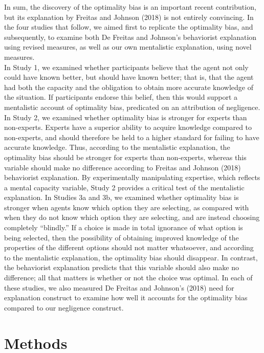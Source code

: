 \documentclass[
  man,floatsintext]{apa6}
\begin{document}
In sum, the discovery of the optimality bias is an important recent contribution, but its explanation by Freitas and Johnson (2018) is not entirely convincing. In the four studies that follow, we aimed first to replicate the optimality bias, and subsequently, to examine both De Freitas and Johnson's behaviorist explanation using revised measures, as well as our own mentalistic explanation, using novel measures.\\
In Study 1, we examined whether participants believe that the agent not only could have known better, but should have known better; that is, that the agent had both the capacity and the obligation to obtain more accurate knowledge of the situation. If participants endorse this belief, then this would support a mentalistic account of optimality bias, predicated on an attribution of negligence. In Study 2, we examined whether optimality bias is stronger for experts than non-experts. Experts have a superior ability to acquire knowledge compared to non-experts, and should therefore be held to a higher standard for failing to have accurate knowledge. Thus, according to the mentalistic explanation, the optimality bias should be stronger for experts than non-experts, whereas this variable should make no difference according to Freitas and Johnson (2018) behaviorist explanation. By experimentally manipulating expertise, which reflects a mental capacity variable, Study 2 provides a critical test of the mentalistic explanation. In Studies 3a and 3b, we examined whether optimality bias is stronger when agents know which option they are selecting, as compared with when they do not know which option they are selecting, and are instead choosing completely ``blindly.'' If a choice is made in total ignorance of what option is being selected, then the possibility of obtaining improved knowledge of the properties of the different options should not matter whatsoever, and according to the mentalistic explanation, the optimality bias should disappear. In contrast, the behaviorist explanation predicts that this variable should also make no difference; all that matters is whether or not the choice was optimal. In each of these studies, we also measured De Freitas and Johnson's (2018) need for explanation construct to examine how well it accounts for the optimality bias compared to our negligence construct.

\hypertarget{methods}{%
\section{Methods}\label{methods}}
\end{document}
